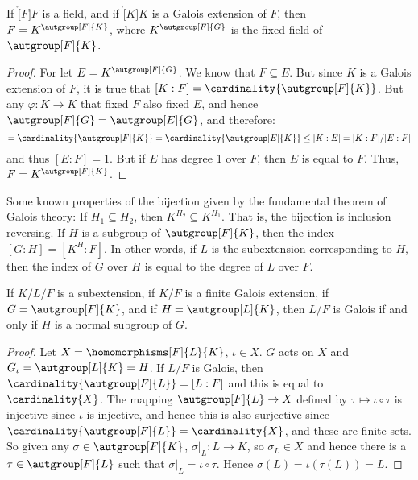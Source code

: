     \begin{theorem}
        If $\ring[F]{F}$ is a field, and if $\ring[K]{K}$ is a Galois
        extension of $F$, then $F=K^{\autgroup[F]{K}}$, where
        $K^{\autgroup[F]{G}}$ is the fixed field of $\autgroup[F]{K}$.
    \end{theorem}
    \begin{proof}
        For let $E=K^{\autgroup[F]{G}}$. We know that $F\subseteq{E}$.
        But since $K$ is a Galois extension of $F$, it is true that
        $[K:F]=\cardinality{\autgroup[F]{K}}$. But any
        $\varphi:K\rightarrow{K}$ that fixed $F$ also fixed $E$, and hence
        $\autgroup[F]{G}=\autgroup[E]{G}$, and therefore:
        \begin{equation}
            [K:F]=\cardinality{\autgroup[F]{K}}
                =\cardinality{\autgroup[E]{K}}
                \leq[K:E]=[K:F]/[E:F]
        \end{equation}
        and thus $[E:F]=1$. But if $E$ has degree 1 over $F$, then
        $E$ is equal to $F$. Thus, $F=K^{\autgroup[F]{K}}$.
    \end{proof}
    Some known properties of the bijection given by the fundamental theorem
    of Galois theory: If $H_{1}\subseteq{H}_{2}$, then
    $K^{H_{2}}\subseteq{K}^{H_{1}}$. That is, the bijection is inclusion
    reversing. If $H$ is a subgroup of $\autgroup[F]{K}$, then
    the index $[G:H]=[K^{H}:F]$. In other words, if $L$ is the
    subextension corresponding to $H$, then the index of $G$ over $H$ is
    equal to the degree of $L$ over $F$.
    \begin{theorem}
        If $K/L/F$ is a subextension, if $K/F$ is a finite Galois extension,
        if $G=\autgroup[F]{K}$, and if $H=\autgroup[L]{K}$, then
        $L/F$ is Galois if and only if $H$ is a normal subgroup of $G$.
    \end{theorem}
    \begin{proof}
        Let $X=\homomorphisms[F]{L}{K}$, $\iota\in{X}$. $G$ acts on $X$ and
        $G_{\iota}=\autgroup[L]{K}=H$. If $L/F$ is Galois, then
        $\cardinality{\autgroup[F]{L}}=[L:F]$ and this is equal to
        $\cardinality{X}$. The mapping $\autgroup[F]{L}\rightarrow{X}$
        defined by $\tau\mapsto\iota\circ\tau$ is injective since $\iota$
        is injective, and hence this is also surjective since
        $\cardinality{\autgroup[F]{L}}=\cardinality{X}$, and these are
        finite sets. So given any $\sigma\in\autgroup[F]{K}$,
        $\sigma|_{L}:L\rightarrow{K}$, so $\sigma_{L}\in{X}$ and hence
        there is a $\tau\in\autgroup[F]{L}$ such that
        $\sigma|_{L}=\iota\circ\tau$. Hence $\sigma(L)=\iota(\tau(L))=L$.
    \end{proof}
